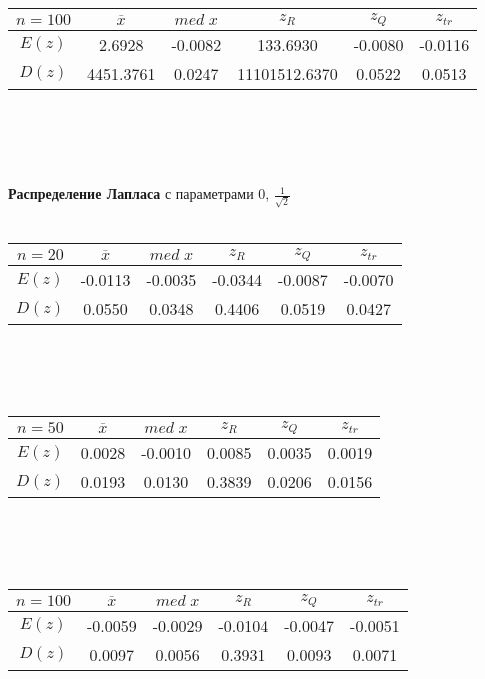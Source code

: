 \documentclass[12pt]{article}
\begin{document}
\\
\\ \\ 
\begin{tabular}{ | c | c | c | c | c | c |}
\hline
$n = 100$ & $\overline{x}$ & $med\;x$ & $z_R$ & $z_Q$ & $z_{tr}$ \\ \hline
$E(z)$ & 2.6928 & -0.0082 & 133.6930 & -0.0080 & -0.0116 \\ \hline
$D(z)$ & 4451.3761 & 0.0247 & 11101512.6370 & 0.0522 & 0.0513 \\ \hline
\end{tabular}
\\ \\
\\ \\
\textbf{Распределение Лапласа} с параметрами 0, $\frac{1}{\sqrt{2}}$
\\ \\ 
\begin{tabular}{ | c | c | c | c | c | c |}
\hline
$n = 20$ & $\overline{x}$ & $med\;x$ & $z_R$ & $z_Q$ & $z_{tr}$ \\ \hline
$E(z)$ & -0.0113 & -0.0035 & -0.0344 & -0.0087 & -0.0070 \\ \hline
$D(z)$ & 0.0550 & 0.0348 & 0.4406 & 0.0519 & 0.0427 \\ \hline
\end{tabular}
\\
\\ \\ 
\begin{tabular}{ | c | c | c | c | c | c |}
\hline
$n = 50$ & $\overline{x}$ & $med\;x$ & $z_R$ & $z_Q$ & $z_{tr}$ \\ \hline
$E(z)$ & 0.0028 & -0.0010 & 0.0085 & 0.0035 & 0.0019 \\ \hline
$D(z)$ & 0.0193 & 0.0130 & 0.3839 & 0.0206 & 0.0156 \\ \hline
\end{tabular}
\\
\\ \\ 
\begin{tabular}{ | c | c | c | c | c | c |}
\hline
$n = 100$ & $\overline{x}$ & $med\;x$ & $z_R$ & $z_Q$ & $z_{tr}$ \\ \hline
$E(z)$ & -0.0059 & -0.0029 & -0.0104 & -0.0047 & -0.0051 \\ \hline
$D(z)$ & 0.0097 & 0.0056 & 0.3931 & 0.0093 & 0.0071 \\ \hline
\end{tabular}
\end{document}
